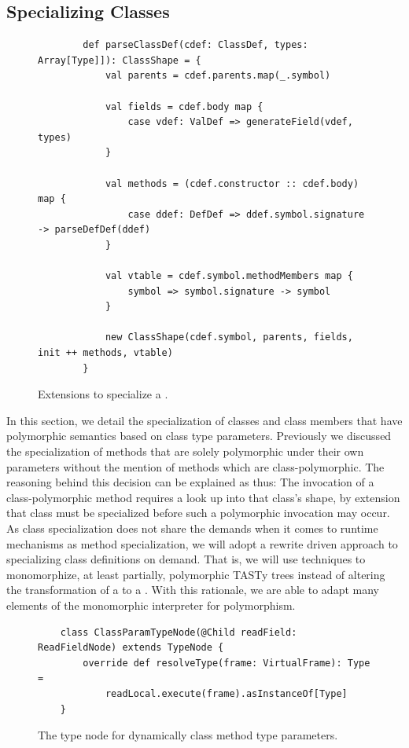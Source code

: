 \subsection{Specializing Classes}

\begin{figure}[!htb]
	\begin{verbatim}
		def parseClassDef(cdef: ClassDef, types: Array[Type]]): ClassShape = {
			val parents = cdef.parents.map(_.symbol)
			
			val fields = cdef.body map {
				case vdef: ValDef => generateField(vdef, types)	
			}
			
			val methods = (cdef.constructor :: cdef.body) map {
				case ddef: DefDef => ddef.symbol.signature -> parseDefDef(ddef)
			}
			
			val vtable = cdef.symbol.methodMembers map {
				symbol => symbol.signature -> symbol
			}
			
			new ClassShape(cdef.symbol, parents, fields, init ++ methods, vtable)
		}
	\end{verbatim}
	\caption{Extensions to specialize a .}
	\label{impl:specialize-class}
\end{figure}

In this section, we detail the specialization of classes and class members that have polymorphic semantics based on class type parameters.
Previously we discussed the specialization of methods that are solely polymorphic under their own parameters without the mention of methods which are class-polymorphic.
The reasoning behind this decision can be explained as thus: The invocation of a class-polymorphic method requires a look up into that class's shape, by extension that class must be specialized before such a polymorphic invocation may occur.
As class specialization does not share the demands when it comes to runtime mechanisms as method specialization, we will adopt a rewrite driven approach to specializing class definitions on demand.
That is, we will use techniques to monomorphize, at least partially, polymorphic TASTy trees instead of altering the transformation of a  to a .
With this rationale, we are able to adapt many elements of the monomorphic interpreter for polymorphism.

\begin{figure}[!htb]
	\begin{verbatim}
	class ClassParamTypeNode(@Child readField: ReadFieldNode) extends TypeNode {
		override def resolveType(frame: VirtualFrame): Type = 
			readLocal.execute(frame).asInstanceOf[Type]
	}
	\end{verbatim}
	\caption{The type node for dynamically class method type parameters.}
	\label{impl:class-param-typenode}
\end{figure}

